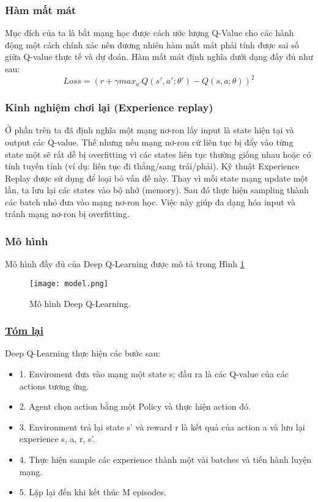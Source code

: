 \subsubsection{Hàm mất mát}
Mục đích của ta là bắt mạng học được cách ước lượng Q-Value cho các hành động một cách chính xác nên đương nhiên 
hàm mất mát phải tính được sai số giữa Q-value thực tế và dự đoán. Hàm mất mát định nghĩa dưới dạng đầy đủ 
như sau:
\begin{equation}
    \label{eq:lossf}
    Loss = (r + \gamma max_{a'}Q(s', a'; \theta') - Q(s, a; \theta))^2
\end{equation}
\subsubsection{Kinh nghiệm chơi lại (Experience replay)} 
Ở phần trên ta đã định nghĩa một mạng nơ-ron lấy input là state hiện tại và output các Q-value. 
Thế nhưng nếu mạng nơ-ron  cứ liên tục bị đẩy vào từng state một sẽ rất dễ bị overfitting 
vì các states liên tục thường giống nhau hoặc có tính tuyến tính (ví dụ: liên tục 
đi thẳng/sang trái/phải). Kỹ thuật Experience Replay được sử dụng để loại bỏ vấn đề này.
 Thay vì mỗi state mạng update một lần, ta lưu lại các states vào bộ nhớ (memory).
 Sau đó thực hiện sampling thành các batch nhỏ đưa vào mạng nơ-ron học. Việc này giúp đa 
 dạng hóa input và tránh mạng nơ-ron bị overfitting.
 \subsubsection{Mô hình}
 Mô hình đầy đủ của Deep Q-Learning được mô tả trong Hình \ref{fig:deepqlearning}
 \begin{figure}[ht]
    \centering
    \texttt{[image: model.png]}
    \caption{Mô hình Deep Q-Learning.}
    \label{fig:deepqlearning}
\end{figure}
\subsubsection{\underline{Tóm lại}}
Deep Q-Learning thực hiện các bước sau:
\begin{itemize}
    \item 1. Enviroment đưa vào mạng một state s; đầu ra là các Q-value của các actions tương ứng.
    \item 2. Agent chọn action bằng một Policy và thực hiện action đó.
    \item 3. Environment trả lại state s' và reward r là kết quả của action a và lưu lại experience s, a, r, s'.
    \item 4. Thực hiện sample các experience thành một vài batches và tiến hành luyện mạng.
    \item 5. Lặp lại đến khi kết thúc M episodes.
\end{itemize}